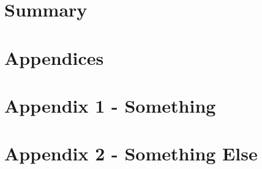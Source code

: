 \documentclass[12pt, a4paper]{report}
\begin{document}
\chapter{Summary}\label{chapter:summary} 


\pagebreak
{}
{}
\printbibliography

\pagebreak
{}
\appendix
{}
\chapter*{Appendices}
\renewcommand{\thechapter}{\arabic{chapter}}

\label{chapter:appendix-one}
{\let\clearpage\relax\chapter*{Appendix 1 - Something}}


\clearpage
{}
{}\label{chapter:appendix-something-else}
\chapter*{Appendix 2 - Something Else}

\end{document}
